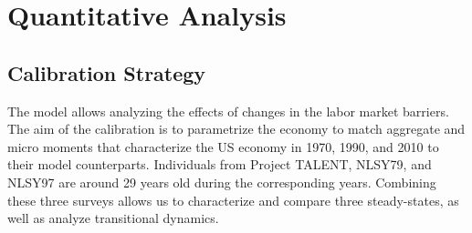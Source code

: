 \documentclass[onehalfspacing,11pt]{article}
\begin{document}
%
%
%
\section{Quantitative Analysis}\label{sec:quant}
\subsection{Calibration Strategy}
The model allows analyzing the effects of changes in the labor market barriers. The aim of the calibration is to parametrize the economy to match aggregate and micro moments that characterize the US economy in 1970, 1990, and 2010 to their model counterparts. Individuals from Project TALENT, NLSY79, and NLSY97 are around 29 years old during the corresponding years. Combining these three surveys allows us to characterize and compare three steady-states, as well as analyze transitional dynamics.
\end{document}
